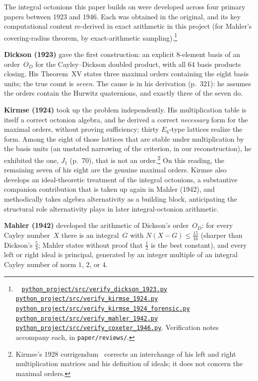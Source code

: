 \documentclass[twoside,english]{paper}
\numberwithin{equation}{section}
\numberwithin{figure}{section}
\theoremstyle{definition}
\theoremstyle{remark}
\newcommand{\Nrm}{N}                  %
\newcommand{\scriptref}[1]{\cite{repo}~%
  \href{https://github.com/koeplinger/leech\_alg/blob/main/python\_project/src/#1}%
  {\nolinkurl{python_project/src/#1}}}
\begin{document}
The integral octonions this paper builds on were developed across four
primary papers between 1923 and 1946.  Each was obtained in the
original, and its key computational content re-derived in exact
arithmetic in this project (for Mahler's covering-radius theorem, by
exact-arithmetic sampling).\footnote{\scriptref{verify\_dickson\_1923.py}
\scriptref{verify\_kirmse\_1924.py}
\scriptref{verify\_kirmse\_1924\_forensic.py} \scriptref{verify\_mahler\_1942.py}
\scriptref{verify\_coxeter\_1946.py}.  Verification notes accompany each,
in \texttt{paper/reviews/}.}

\noindent\textbf{Dickson (1923)} \cite{Dickson1923} gave the first
construction: an explicit 8-element basis of an order~$O_D$ for the
Cayley--Dickson doubled product, with all 64 basis products
closing.  His Theorem~XV states three maximal orders containing the
eight basis units; the true count is \emph{seven}.  The cause is in his derivation (p.~321): he assumes
the orders contain the Hurwitz quaternions, and exactly three of the
seven do.

\noindent\textbf{Kirmse (1924)} \cite{Kirmse1924} took up the problem
independently.  His multiplication table is itself a correct
octonion algebra, and he derived a correct \emph{necessary} form
for the maximal orders, without proving sufficiency; thirty
$E_8$-type lattices realize the form.  Among the eight of those lattices that
are stable under multiplication by the basis units (an unstated
narrowing of the criterion, in our reconstruction), he exhibited the
one, $J_1$ (p.~70), that is not an order.\footnote{Kirmse's 1928
corrigendum~\cite{Kirmse1928} corrects an interchange of his left and
right multiplication matrices and his definition of ideals; it does not
concern the maximal orders.}  On this reading, the
remaining seven of his eight are the genuine maximal orders.  Kirmse also develops an
ideal-theoretic treatment of the integral octonions, a substantive
companion contribution that is taken up again in Mahler (1942),
and methodically takes algebra alternativity as a building
block, anticipating the structural role alternativity plays in
later integral-octonion arithmetic.

\noindent\textbf{Mahler (1942)} \cite{Mahler1942} developed the
arithmetic of Dickson's order~$O_D$: for every Cayley number~$X$ there is
an integral~$G$ with $\Nrm(X-G)\le\tfrac{15}{16}$ (sharper than
Dickson's $\tfrac54$; Mahler states without proof that $\tfrac12$ is the
best constant), and every left or right ideal is principal, generated by
an integer multiple of an integral Cayley number of norm $1$, $2$, or $4$.
\end{document}
